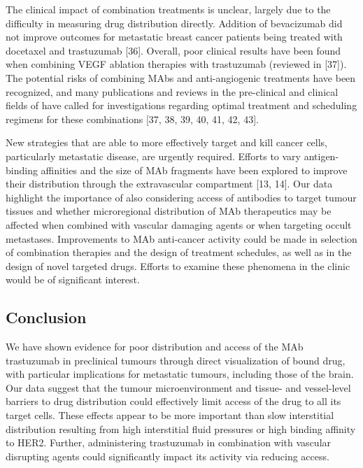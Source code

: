The clinical impact of combination treatments is unclear, largely due to the difficulty in measuring drug distribution directly.
Addition of bevacizumab did not improve outcomes for metastatic breast cancer patients being treated with docetaxel and trastuzumab [36].
Overall, poor clinical results have been found when combining VEGF ablation therapies with trastuzumab (reviewed in [37]).
The potential risks of combining \ac{MAbs} and anti-angiogenic treatments have been recognized, and many publications and reviews in the pre-clinical and clinical fields of have called for investigations regarding optimal treatment and scheduling regimens for these combinations [37, 38, 39, 40, 41, 42, 43].

New strategies that are able to more effectively target and kill cancer cells, particularly metastatic disease, are urgently required.
Efforts to vary antigen-binding affinities and the size of \ac{MAb} fragments have been explored to improve their distribution through the extravascular compartment [13, 14].
Our data highlight the importance of also considering access of antibodies to target tumour tissues and whether microregional distribution of \ac{MAb} therapeutics may be affected when combined with vascular damaging agents or when targeting occult metastases.
Improvements to \ac{MAb} anti-cancer activity could be made in selection of combination therapies and the design of treatment schedules, as well as in the design of novel targeted drugs.
Efforts to examine these phenomena in the clinic would be of significant interest.

\subsection{Conclusion}

We have shown evidence for poor distribution and access of the \ac{MAb} trastuzumab in preclinical tumours through direct visualization of bound drug, with particular implications for metastatic tumours, including those of the brain.
Our data suggest that the tumour microenvironment and tissue- and vessel-level barriers to drug distribution could effectively limit access of the drug to all its target cells.
These effects appear to be more important than slow interstitial distribution resulting from high interstitial fluid pressures or high binding affinity to HER2.
Further, administering trastuzumab in combination with vascular disrupting agents could significantly impact its activity via reducing access.


